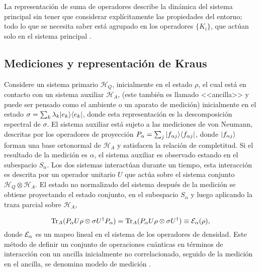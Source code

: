 La representación de suma de operadores describe la dinámica del sistema principal sin tener que considerar explícitamente las propiedades del entorno; todo lo que se necesita saber está agrupado en los operadores $\{K_i\}$, que actúan solo en el sistema principal {\cite{nielsen_chuang_2010}}.




\subsection{Mediciones y representación de Kraus}\label{Medicion_RepresentacionDeKraus} %

Considere un sistema primario $\mathcal{H}_Q$, inicialmente en el estado $\rho$,  el cual está en contacto con un sistema auxiliar $\mathcal{H}_A$, (este también es llamado <<ancilla>> y puede ser pensado como el ambiente o un aparato de medición) inicialmente en el estado $\sigma=\sum_k \lambda_k |e_k\rangle \langle e_k|$, donde esta representación es la descomposición espectral de $\sigma$. El sistema auxiliar está sujeto a las mediciones de von Neumann, descritas por los operadores de proyección $P_\alpha=\sum_j |f_{\alpha j}\rangle \langle f_{\alpha j}|$,  donde $|f_{\alpha j}\rangle$ forman una base ortonormal de $\mathcal{H}_A$ y satisfacen la relación de completitud. Si el resultado de la medición es $\alpha$, el sistema auxiliar es observado estando en el subespacio $S_\alpha$. Los dos sistemas interactúan durante un tiempo, esta interacción es descrita por un operador unitario $U$ que actúa sobre el sistema conjunto $\mathcal{H}_Q\otimes \mathcal{H}_A$. El estado no normalizado del sistema después de la medición se obtiene proyectando el estado conjunto, en el subespacio $S_\alpha$ y luego aplicando la traza parcial sobre $\mathcal{H}_A$,

\begin{equation}\label{measurement_model}
    {\rm Tr}_A(P_\alpha U \rho \otimes \sigma U^\dagger P_\alpha)= {\rm Tr}_A(P_\alpha U \rho \otimes \sigma U^\dagger)\equiv \mathcal{E}_\alpha(\rho),
\end{equation} donde $\mathcal{E}_\alpha$ es un mapeo lineal en el sistema de los operadores de densidad. Este método de definir un conjunto de operaciones cuánticas en términos de interacción con un ancilla inicialmente no correlacionado, seguido de la medición en el ancilla, se denomina modelo de medición {\cite{unm2014, nielsen_chuang_2010}}.

